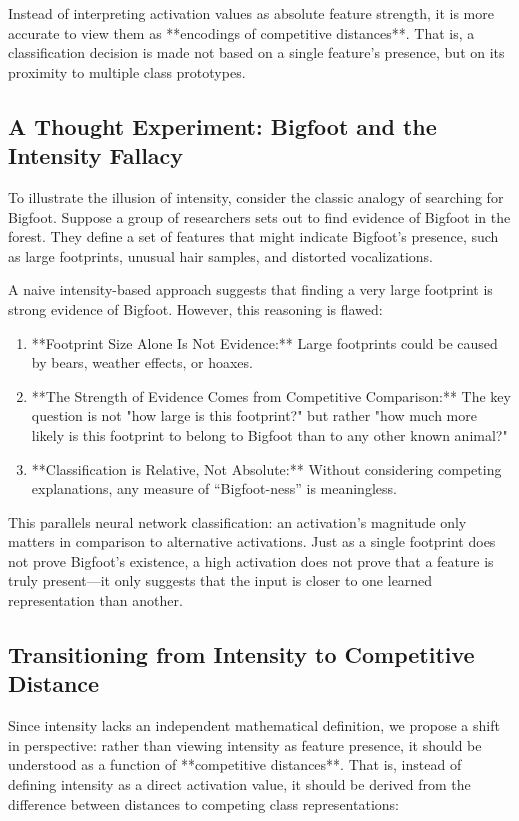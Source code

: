 Instead of interpreting activation values as absolute feature strength, it is more accurate to view them as **encodings of competitive distances**. That is, a classification decision is made not based on a single feature’s presence, but on its proximity to multiple class prototypes.

\subsection{A Thought Experiment: Bigfoot and the Intensity Fallacy}

To illustrate the illusion of intensity, consider the classic analogy of searching for Bigfoot. Suppose a group of researchers sets out to find evidence of Bigfoot in the forest. They define a set of features that might indicate Bigfoot’s presence, such as large footprints, unusual hair samples, and distorted vocalizations.

A naive intensity-based approach suggests that finding a very large footprint is strong evidence of Bigfoot. However, this reasoning is flawed:

\begin{enumerate}
    \item **Footprint Size Alone Is Not Evidence:** Large footprints could be caused by bears, weather effects, or hoaxes.
    \item **The Strength of Evidence Comes from Competitive Comparison:** The key question is not "how large is this footprint?" but rather "how much more likely is this footprint to belong to Bigfoot than to any other known animal?"
    \item **Classification is Relative, Not Absolute:** Without considering competing explanations, any measure of “Bigfoot-ness” is meaningless.
\end{enumerate}

This parallels neural network classification: an activation’s magnitude only matters in comparison to alternative activations. Just as a single footprint does not prove Bigfoot’s existence, a high activation does not prove that a feature is truly present—it only suggests that the input is closer to one learned representation than another.

\subsection{Transitioning from Intensity to Competitive Distance}

Since intensity lacks an independent mathematical definition, we propose a shift in perspective: rather than viewing intensity as feature presence, it should be understood as a function of **competitive distances**. That is, instead of defining intensity as a direct activation value, it should be derived from the difference between distances to competing class representations:

